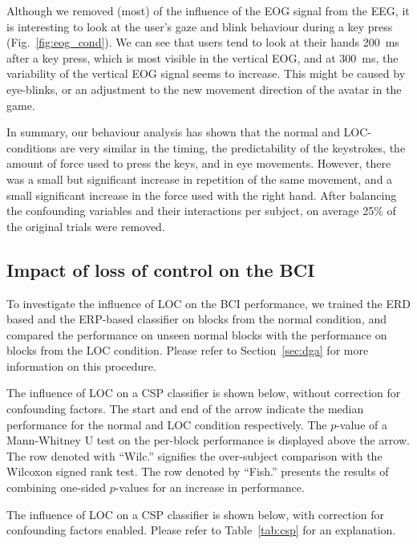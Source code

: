 Although we removed (most) of the influence of the \ac{EOG} signal from the
\ac{EEG}, it is interesting to look at the user's gaze and blink behaviour
during a key press (Fig.~\ref{fig:eog_cond}). We can see that users tend to
look at their hands 200~ms after a key press, which is most visible in the
vertical \ac{EOG}, and at 300~ms, the variability of the vertical \ac{EOG}
signal seems to increase. This might be caused by eye-blinks, or an adjustment
to the new movement direction of the avatar in the game. 

In summary, our behaviour analysis has shown that the normal and
\ac{LOC}-con\-di\-tions are very similar in the timing, the predictability of
the key\-strokes, the amount of force used to press the keys, and in eye
movements. However, there was a small but significant increase in repetition of
the same movement, and a small significant increase in the force used with the
right hand. After balancing the confounding variables and their interactions
per subject, on average 25\% of the original trials were removed.

\subsection{Impact of loss of control on the BCI}
To investigate the influence of \ac{LOC} on the \ac{BCI} performance, we
trained the \ac{ERD} based and the \ac{ERP}-based classifier on blocks from the
normal condition, and compared the performance on unseen normal blocks with the
performance on blocks from the \ac{LOC} condition. Please refer to
Section~\ref{sec:dga} for more information on this procedure.

\begin{table} 
  \caption{The influence of \protect\ac{LOC} on a \protect\ac{CSP} classifier
  is shown below, without correction for confounding factors. The start and end
  of the arrow indicate the median performance for the normal and
  \protect\ac{LOC} condition respectively. The $p$-value of a Mann-Whitney U
  test on the per-block performance is displayed above the arrow. The row
  denoted with ``Wilc.'' signifies the over-subject comparison with the Wilcoxon
  signed rank test. The row denoted by ``Fish.'' presents the results of
  combining one-sided $p$-values for an increase in performance.}
  \center \scriptsize
  
  \label{tab:csp}
\end{table}

\begin{table} 
  \caption{The influence of \protect\ac{LOC} on a \protect\ac{CSP} classifier
  is shown below, with correction for confounding factors enabled. Please refer
  to Table~\ref{tab:csp} for an explanation. } 
  \center \scriptsize
  
  \label{tab:csp_bal}
\end{table}

